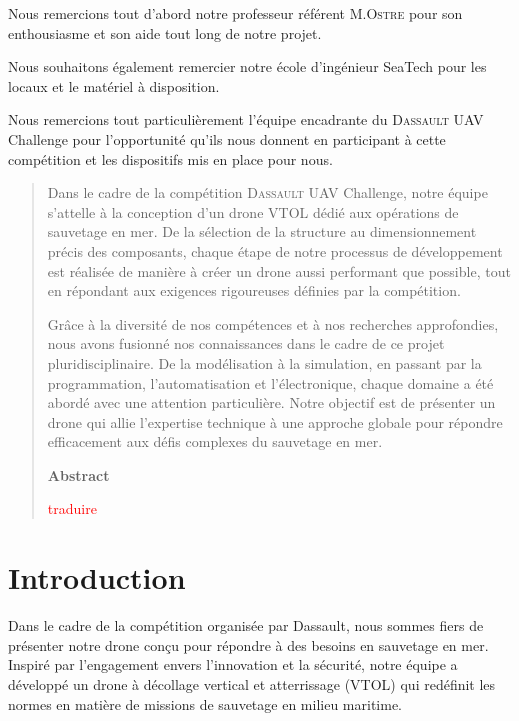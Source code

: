 \documentclass[a4paper,12pt,french]{report}
\begin{document}
Nous remercions tout d'abord notre professeur référent M.\textsc{Ostre} pour son enthousiasme et son aide tout long de notre projet.\newline

Nous souhaitons également remercier notre école d'ingénieur SeaTech pour les locaux et le matériel à disposition.\newline

Nous remercions tout particulièrement l'équipe encadrante du \textsc{Dassault} UAV Challenge pour l'opportunité qu'ils nous donnent en participant à cette compétition et les dispositifs mis en place pour nous.

\tableofcontents


\begin{abstract}
    Dans le cadre de la compétition \textsc{Dassault} UAV Challenge, notre équipe s'attelle à la conception d'un drone VTOL dédié aux opérations de sauvetage en mer. De la sélection de la structure au dimensionnement précis des composants, chaque étape de notre processus de développement est réalisée de manière à créer un drone aussi performant que possible, tout en répondant aux exigences rigoureuses définies par la compétition.

    Grâce à la diversité de nos compétences et à nos recherches approfondies, nous avons fusionné nos connaissances dans le cadre de ce projet pluridisciplinaire. De la modélisation à la simulation, en passant par la programmation, l'automatisation et l'électronique, chaque domaine a été abordé avec une attention particulière. Notre objectif est de présenter un drone qui allie l'expertise technique à une approche globale pour répondre efficacement aux défis complexes du sauvetage en mer. \vskip4cm

    \begin{center}
        \bfseries Abstract
    \end{center}

    \noindent
    \textcolor{red}{traduire}
\end{abstract}

\chapter*{Introduction}

Dans le cadre de la compétition organisée par Dassault, nous sommes fiers de présenter notre drone conçu pour répondre à des besoins en sauvetage en mer. Inspiré par l'engagement envers l'innovation et la sécurité, notre équipe a développé un drone à décollage vertical et atterrissage (VTOL) qui redéfinit les normes en matière de missions de sauvetage en milieu maritime.\newline
\end{document}
